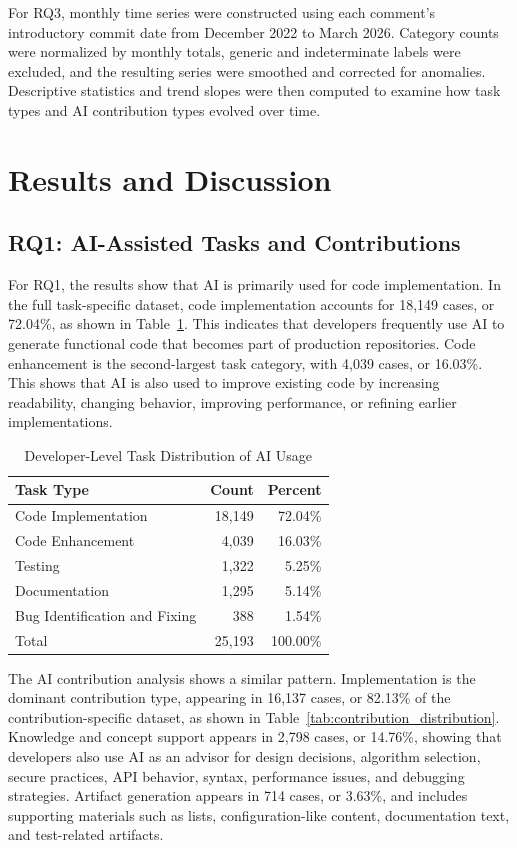\documentclass[12pt,draftclsnofoot,onecolumn]{IEEEtran}
\begin{document}
For RQ3, monthly time series were constructed using each comment's introductory commit date from December 2022 to March 2026. Category counts were normalized by monthly totals, generic and indeterminate labels were excluded, and the resulting series were smoothed and corrected for anomalies. Descriptive statistics and trend slopes were then computed to examine how task types and AI contribution types evolved over time.

\section{Results and Discussion}

\subsection{RQ1: AI-Assisted Tasks and Contributions}

For RQ1, the results show that AI is primarily used for code implementation. In the full task-specific dataset, code implementation accounts for 18,149 cases, or 72.04\%, as shown in Table~\ref{tab:task_distribution}. This indicates that developers frequently use AI to generate functional code that becomes part of production repositories. Code enhancement is the second-largest task category, with 4,039 cases, or 16.03\%. This shows that AI is also used to improve existing code by increasing readability, changing behavior, improving performance, or refining earlier implementations.

\begin{table}[!t]
\caption{Developer-Level Task Distribution of AI Usage}
\label{tab:task_distribution}
\centering
\small
\begin{tabularx}{0.86\linewidth}{Xrr}
\toprule
\textbf{Task Type} & \textbf{Count} & \textbf{Percent} \\
\midrule
Code Implementation & 18,149 & 72.04\% \\
Code Enhancement & 4,039 & 16.03\% \\
Testing & 1,322 & 5.25\% \\
Documentation & 1,295 & 5.14\% \\
Bug Identification and Fixing & 388 & 1.54\% \\
\midrule
Total & 25,193 & 100.00\% \\
\bottomrule
\end{tabularx}
\end{table}

The AI contribution analysis shows a similar pattern. Implementation is the dominant contribution type, appearing in 16,137 cases, or 82.13\% of the contribution-specific dataset, as shown in Table~\ref{tab:contribution_distribution}. Knowledge and concept support appears in 2,798 cases, or 14.76\%, showing that developers also use AI as an advisor for design decisions, algorithm selection, secure practices, API behavior, syntax, performance issues, and debugging strategies. Artifact generation appears in 714 cases, or 3.63\%, and includes supporting materials such as lists, configuration-like content, documentation text, and test-related artifacts.
\end{document}
